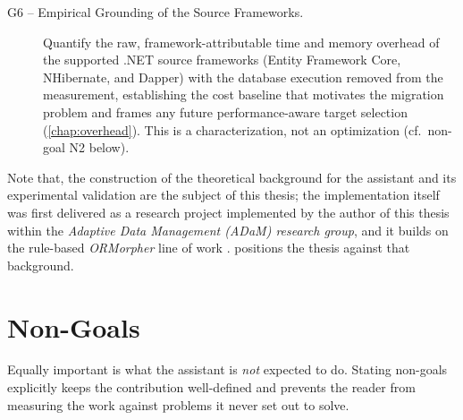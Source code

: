\begin{description}
  \item[G6 -- Empirical Grounding of the Source Frameworks.] Quantify the raw, framework-attributable time and memory overhead of the supported .NET source frameworks (Entity Framework Core, NHibernate, and Dapper) with the database execution removed from the measurement, establishing the cost baseline that motivates the migration problem and frames any future performance-aware target selection (\cref{chap:overhead}). This is a characterization, not an optimization (cf.\ non-goal N2 below).
\end{description}

Note that, the construction of the theoretical background for the assistant and its experimental validation are the subject of this thesis; the implementation itself was first delivered as a research project implemented by the author of this thesis within the \emph{Adaptive Data Management (ADaM) research group}, and it builds on the rule-based \emph{ORMorpher} line of work \cite{abrahamORMorpherInteractiveFramework2026, abrahamFrameworkAgnosticQueryAdaptation2025}.  positions the thesis against that background.

\section{Non-Goals}
\label{sec:problem-nongoals}

Equally important is what the assistant is \emph{not} expected to do. Stating non-goals explicitly keeps the contribution well-defined and prevents the reader from measuring the work against problems it never set out to solve.


